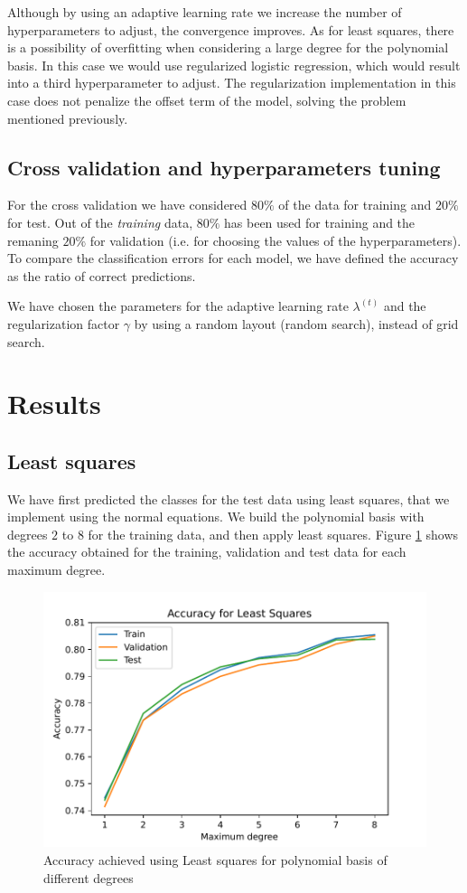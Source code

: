 \documentclass[10pt,conference,compsocconf]{IEEEtran}
\begin{document}
  	Although by using an adaptive learning rate we increase the number of hyperparameters to adjust, the convergence improves.
  	As for least squares, there is a possibility of overfitting when considering a large degree for the polynomial basis. In this case we would use regularized logistic regression, which would result into a third hyperparameter to adjust. The regularization implementation in this case does not penalize the offset term of the model, solving the problem mentioned previously.

	\subsection{Cross validation and hyperparameters tuning} %
	\label{sub:cross_validation_and_hyperparameters_tuning}
  	For the cross validation we have considered $80\%$ of the data for training and $20\%$ for test. Out of the \emph{training} data, $80\%$ has been used for training and the remaning $20\%$ for validation (i.e. for choosing the values of the hyperparameters). To compare the classification errors for each model, we have defined the accuracy as the ratio of correct predictions.

  	We have chosen the parameters for the adaptive learning rate $\lambda^{(t)}$ and the regularization factor $\gamma$ by using a random layout (random search), instead of grid search.

\section{Results}
\label{sec:results}
  \subsection{Least squares} %
  \label{sub:least_squares}
    We have first predicted the classes for the test data using least squares, that we implement using the normal equations. We build the polynomial basis with degrees $2$ to $8$ for the training data, and then apply least squares. Figure \ref{fig:1LSprec} shows the accuracy obtained for the training, validation and test data for each maximum degree.

    \begin{figure}[htp]
      \centering
      \includegraphics[width=.6\textwidth]{1LSprec}
      \caption{Accuracy achieved using Least squares for polynomial basis of different degrees}
      \label{fig:1LSprec}
    \end{figure}
\end{document}
